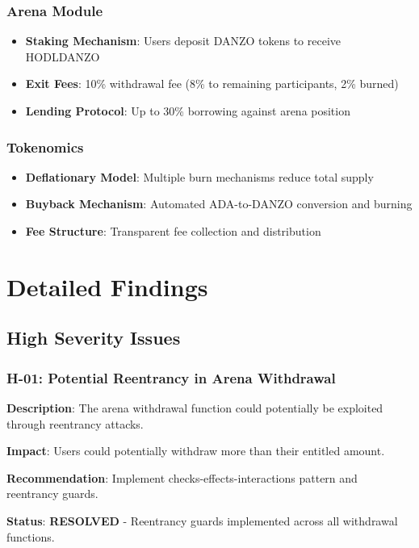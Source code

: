 \documentclass[11pt,a4paper]{article}
\begin{document}
\subsubsection{Arena Module}
\begin{itemize}
    \item \textbf{Staking Mechanism}: Users deposit DANZO tokens to receive HODLDANZO
    \item \textbf{Exit Fees}: 10\% withdrawal fee (8\% to remaining participants, 2\% burned)
    \item \textbf{Lending Protocol}: Up to 30\% borrowing against arena position
\end{itemize}

\subsubsection{Tokenomics}
\begin{itemize}
    \item \textbf{Deflationary Model}: Multiple burn mechanisms reduce total supply
    \item \textbf{Buyback Mechanism}: Automated ADA-to-DANZO conversion and burning
    \item \textbf{Fee Structure}: Transparent fee collection and distribution
\end{itemize}

\section{Detailed Findings}

\subsection{High Severity Issues}

\subsubsection{H-01: Potential Reentrancy in Arena Withdrawal}
\textbf{Description}: The arena withdrawal function could potentially be exploited through reentrancy attacks.

\textbf{Impact}: Users could potentially withdraw more than their entitled amount.

\textbf{Recommendation}: Implement checks-effects-interactions pattern and reentrancy guards.

\textbf{Status}: \textcolor{danzoGreen}{\textbf{RESOLVED}} - Reentrancy guards implemented across all withdrawal functions.
\end{document}
